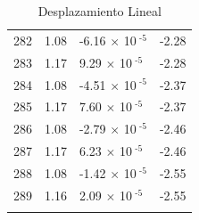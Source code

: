 \documentclass[a4paper,11pt]{article}
\begin{document}
\begin{center}
\begin{longtable}{|R{1.5cm}|R{2.5cm}|R{2.5cm}|R{2.5cm}|}
  282 &   1.08  &        -6.16 $\times$ 10$^{\text{          -5}}$  &  -2.28 \\ 
  283 &   1.17  &         9.29 $\times$ 10$^{\text{          -5}}$  &  -2.28 \\ 
  284 &   1.08  &        -4.51 $\times$ 10$^{\text{          -5}}$  &  -2.37 \\ 
  285 &   1.17  &         7.60 $\times$ 10$^{\text{          -5}}$  &  -2.37 \\ 
  286 &   1.08  &        -2.79 $\times$ 10$^{\text{          -5}}$  &  -2.46 \\ 
  287 &   1.17  &         6.23 $\times$ 10$^{\text{          -5}}$  &  -2.46 \\ 
  288 &   1.08  &        -1.42 $\times$ 10$^{\text{          -5}}$  &  -2.55 \\ 
  289 &   1.16  &         2.09 $\times$ 10$^{\text{          -5}}$  &  -2.55 \\ 
\bottomrule[0.8mm]                               
\caption{Desplazamiento Lineal}             
\end{longtable}                                  
\end{center}                                     

\newpage       
\end{document}
